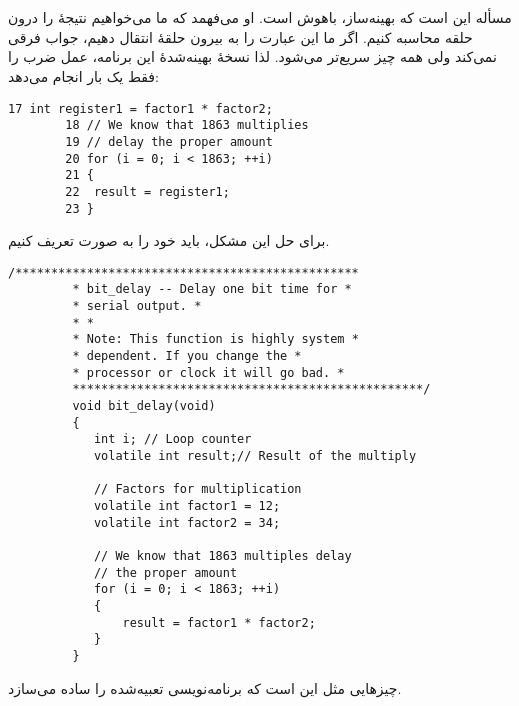 \section{}
\paragraph{}\label{answer:39}
مسأله این است که بهینه‌ساز، باهوش است. او می‌فهمد که ما می‌خواهیم نتیجهٔ  را درون حلقه  محاسبه کنیم. اگر ما این عبارت را به بیرون حلقهٔ  انتقال دهیم، جواب فرقی نمی‌کند ولی همه چیز سریع‌تر می‌شود. لذا نسخهٔ بهینه‌شدهٔ این برنامه، عمل ضرب را فقط یک بار انجام می‌دهد:
\begin{LTR}
    \begin{lstlisting}[style=C++Style]
        17 int register1 = factor1 * factor2;
        18 // We know that 1863 multiplies
        19 // delay the proper amount
        20 for (i = 0; i < 1863; ++i)
        21 {
        22 	result = register1;
        23 }
    \end{lstlisting}
\end{LTR}

برای حل این مشکل، باید  خود را به صورت  تعریف کنیم.
\begin{LTR}
    \begin{lstlisting}[style=C++Style]
         /************************************************
         * bit_delay -- Delay one bit time for *
         * serial output. *
         * *
         * Note: This function is highly system *
         * dependent. If you change the *
         * processor or clock it will go bad. *
         *************************************************/
         void bit_delay(void)
         {
         	int i; // Loop counter
         	volatile int result;// Result of the multiply

         	// Factors for multiplication
         	volatile int factor1 = 12;
         	volatile int factor2 = 34;

         	// We know that 1863 multiples delay
         	// the proper amount
         	for (i = 0; i < 1863; ++i)
         	{
         		result = factor1 * factor2;
         	}
         }
    \end{lstlisting}
\end{LTR}

چیزهایی مثل این است که برنامه‌نویسی تعبیه‌شده را ساده می‌سازد.